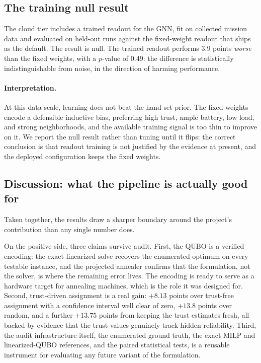 \subsection{The training null result}
\label{sec:res-training}

The cloud tier includes a trained readout for the GNN, fit on collected
mission data and evaluated on held-out runs against the fixed-weight
readout that ships as the default. The result is null. The trained
readout performs 3.9 points \emph{worse} than the fixed weights, with a
$p$-value of $0.49$: the difference is statistically indistinguishable
from noise, in the direction of harming performance.

\paragraph{Interpretation.}
At this data scale, learning does not beat the hand-set prior. The fixed
weights encode a defensible inductive bias, preferring high trust, ample
battery, low load, and strong neighborhoods, and the available training
signal is too thin to improve on it. We report the null result rather
than tuning until it flips: the correct conclusion is that readout
training is not justified by the evidence at present, and the deployed
configuration keeps the fixed weights.

\subsection{Discussion: what the pipeline is actually good for}
\label{sec:res-discussion}

Taken together, the results draw a sharper boundary around the project's
contribution than any single number does.

On the positive side, three claims survive audit. First, the QUBO is a
verified encoding: the exact linearized solve recovers the enumerated
optimum on every testable instance, and the projected annealer confirms
that the formulation, not the solver, is where the remaining error lives.
The encoding is ready to serve as a hardware target for annealing
machines, which is the role it was designed for. Second, trust-driven
assignment is a real gain: $+8.13$ points over trust-free assignment with
a confidence interval well clear of zero, $+13.8$ points over random, and
a further $+13.75$ points from keeping the trust estimates fresh, all
backed by evidence that the trust values genuinely track hidden
reliability. Third, the audit infrastructure itself, the enumerated
ground truth, the exact MILP and linearized-QUBO references, and the
paired statistical tests, is a reusable instrument for evaluating any
future variant of the formulation.

